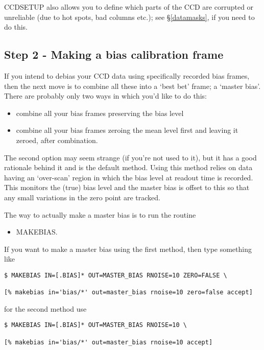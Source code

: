 CCDSETUP also allows you to define which parts of the CCD are
corrupted or unreliable (due to hot spots, bad columns etc.); see
\S\ref{datamasks}, if you need to do this.

\subsection{Step 2 - Making a bias calibration frame} If you intend
to debias your CCD data using specifically recorded bias frames, then
the next move is to combine all these into a `best bet' frame; a `master
bias'. There are probably only two ways in which you'd like to do this:

\begin{itemize}
\item combine all your bias frames preserving the bias level
\item combine all your bias frames zeroing the mean level first and
leaving  it zeroed, after combination.
\end{itemize}

The second option may seem strange (if you're not used to it), but it
has a good rationale behind it and is the default method. Using this
method relies on data having an `over-scan' region in which the bias
level at readout time is recorded. This monitors the (true) bias level
and the master bias is offset to this so that any small variations in
the zero point are tracked.

The way to actually make a master bias is to run the routine 

\begin{itemize}
\item MAKEBIAS.
\end{itemize}

If you want to make a master bias using the first method, then type
something like

\begin{myquote}
\begin{verbatim}
$ MAKEBIAS IN=[.BIAS]* OUT=MASTER_BIAS RNOISE=10 ZERO=FALSE \

[% makebias in='bias/*' out=master_bias rnoise=10 zero=false accept]
\end{verbatim}
\end{myquote}

for the second method use

\begin{myquote}
\begin{verbatim}
$ MAKEBIAS IN=[.BIAS]* OUT=MASTER_BIAS RNOISE=10 \

[% makebias in='bias/*' out=master_bias rnoise=10 accept]
\end{verbatim}
\end{myquote}

